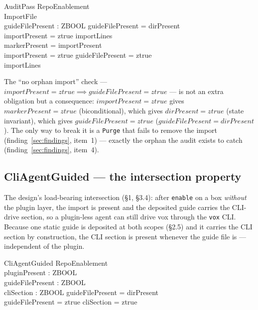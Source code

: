 \documentclass[a4paper,10pt,fleqn]{article}
\begin{document}
\begin{schema}{AuditPass}
  RepoEnablement \\
  ImportFile \\
  guideFilePresent : ZBOOL
  \where
  guideFilePresent = dirPresent \\
  importPresent = ztrue \iff importLines  \\
  markerPresent = importPresent \\
  importPresent = ztrue \implies guideFilePresent = ztrue \\
  importLines 
\end{schema}

The ``no orphan import'' check --- $importPresent = ztrue \implies
guideFilePresent = ztrue$ --- is not an extra obligation but a consequence:
$importPresent = ztrue$ gives $markerPresent = ztrue$ (biconditional), which
gives $dirPresent = ztrue$ (state invariant), which gives $guideFilePresent =
ztrue$ ($guideFilePresent = dirPresent$). The only way to break it is a
\texttt{Purge} that fails to remove the import (finding~\ref{sec:findings},
item~1) --- exactly the orphan the audit exists to catch
(finding~\ref{sec:findings}, item~4).

\subsection{CliAgentGuided --- the intersection property}

The design's load-bearing intersection (\S1, \S3.4): after \texttt{enable} on a
box \emph{without} the plugin layer, the import is present and the deposited
guide carries the CLI-drive section, so a plugin-less agent can still drive vox
through the \texttt{vox} CLI. Because one static guide is deposited at both
scopes (\S2.5) and it carries the CLI section by construction, the CLI section is
present whenever the guide file is --- independent of the plugin.

\begin{schema}{CliAgentGuided}
  RepoEnablement \\
  pluginPresent : ZBOOL \\
  guideFilePresent : ZBOOL \\
  cliSection : ZBOOL
  \where
  guideFilePresent = dirPresent \\
  guideFilePresent = ztrue \implies cliSection = ztrue
\end{schema}
\end{document}
